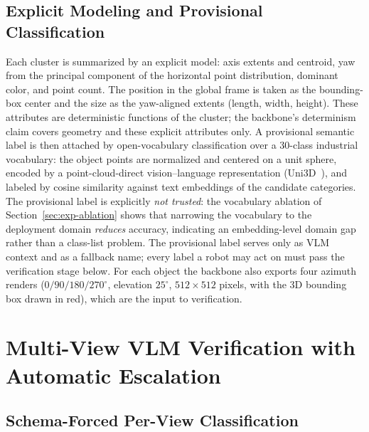 \subsection{Explicit Modeling and Provisional Classification}
\label{subsec:explicit}

Each cluster is summarized by an explicit model: axis extents and centroid,
yaw from the principal component of the horizontal point distribution, dominant
color, and point count. The position in the global frame is taken as the
bounding-box center and the size as the yaw-aligned extents (length, width,
height). These attributes are deterministic functions of the cluster; the
backbone's determinism claim covers geometry and these explicit attributes
only. A provisional semantic label is then attached by open-vocabulary
classification over a 30-class industrial vocabulary: the object points are
normalized and centered on a unit sphere, encoded by a point-cloud-direct
vision--language representation (Uni3D~\cite{zhou2024uni3d}), and labeled by
cosine similarity against text embeddings of the candidate categories. The
provisional label is explicitly \emph{not trusted}: the vocabulary ablation of
Section~\ref{sec:exp-ablation} shows that narrowing the vocabulary to the
deployment domain \emph{reduces} accuracy, indicating an embedding-level domain
gap rather than a class-list problem. The provisional label serves only as VLM
context and as a fallback name; every label a robot may act on must pass the
verification stage below. For each object the backbone also exports four
azimuth renders ($0/90/180/270^{\circ}$, elevation $25^{\circ}$, $512\times512$
pixels, with the 3D bounding box drawn in red), which are the input to
verification.

\section{Multi-View VLM Verification with Automatic Escalation}
\label{sec:verification}

\subsection{Schema-Forced Per-View Classification}
\label{subsec:prompts}

